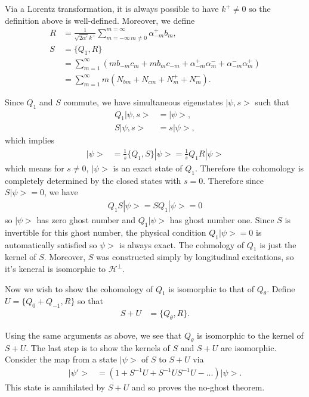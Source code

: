 \documentclass[notitlepage,amsmath,amssymb,aps, pra, 10pt]{revtex4-1}
\begin{document}
    Via a Lorentz transformation, it is always possible to have $k^+ \neq 0 $ so the definition above is well-defined. Moreover, we define 
    \begin{align}
        R &= \frac{1}{\sqrt{2\alpha'} k^+} \sum_{m = -\infty\, m\neq 0} ^{m = \infty} \alpha_{-m}^+ b_m,\\
        S &= \{ Q_1, R\}\\
         &=\sum_{m = 1}^{\infty} (mb_{-m} c_m + mb_m c_{-m} +  \alpha_{-m}^+ \alpha_{m}^- +  \alpha_{-m}^- \alpha_{m}^+)\\
        &= \sum_{m = 1}^{\infty} m(N_{bm} + N_{cm} + N_{m}^+ + N_m^-).
    \end{align}
    
    Since $Q_1$ and $S$ commute, we have simultaneous eigenstates $|\psi, s>$ such that 
    \begin{align}
        Q_1 |\psi, s> &= |\psi>,\\
        S |\psi, s> &= s|\psi > ,
    \end{align}
    which implies 
    \begin{align}
        |\psi> &= \frac{1}{s} \{ Q_1, S\} |\psi> = \frac{1}{s} Q_1 R |\psi>
    \end{align}
    which means for $s\neq0$, $|\psi>$ is an exact state of $Q_1$. Therefore the cohomology is completely determined by the closed states with $s=0$. Therefore since $S|\psi> = 0$, we have
    \begin{align}
        Q_1 S |\psi> = S Q_1 |\psi> = 0
    \end{align}
    so $|\psi>$ has zero ghost number and $Q_1|\psi>$ has ghost number one. Since $S$ is invertible for this ghost number, the physical condition $Q_1 |\psi> = 0$ is automatically satisfied so $\psi>$ is always exact. The cohmology of $Q_1$ is just the kernel of $S$. Moreover, $S$ was constructed simply by longitudinal excitations, so it's keneral is isomorphic to $\mathcal{H}^{\perp}$.
    
    Now we wish to show the cohomology of $Q_1$ is isomorphic to that of $Q_{\theta}$. Define $U = \{Q_0+ Q_{-1}, R\}$ so that
    \begin{align}
        S + U &= \{Q_{\theta}, R\}.
    \end{align}
    
    Using the same arguments as above, we see that $Q_{\theta}$ is isomorphic to the kernel of $S+U$. The last step is to show the kernels of $S$ and $S+U$ are isomorphic. Consider the map from a state $|\psi>$ of $S$ to $S+U$ via 
    \begin{align}
        |\psi'> &= (1+S^{-1}U + S^{-1}US^{-1}U -...) |\psi>.
    \end{align} 
    This state is annihilated by $S+U$ and so proves the no-ghost theorem.
    
    
    
\end{document}
